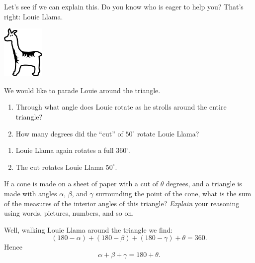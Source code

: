 \documentclass[nooutcomes,noauthor,handout]{../ximera}
\begin{document}
\begin{question}
  Let's see if we can explain this. Do you know who is eager to help
you? That's right: Louie Llama.
\begin{center}
\includegraphics[height=1in]{llama.pdf}
\end{center}

We would like to parade Louie around the triangle.
\begin{enumerate}
\item Through what angle does Louie rotate as he strolls around the
  entire triangle?
\item How many degrees did the ``cut'' of $50^\circ$ rotate Louie
  Llama?
\end{enumerate}
\begin{freeResponse}
  \begin{enumerate}
  \item Louie Llama again rotates a full $360^\circ$.
  \item The cut rotates Louie Llama $50^\circ$.
  \end{enumerate}
\end{freeResponse}
\end{question}

\mynewpage


\begin{question}
If a cone is made on a sheet of paper with a cut of $\theta$ degrees,
and a triangle is made with angles $\alpha$, $\beta$, and $\gamma$
surrounding the point of the cone, what is the sum of the measures of
the interior angles of this triangle? \emph{Explain} your reasoning using words, pictures, numbers, and so on.
\begin{freeResponse}
  Well, walking Louie Llama around the triangle we find:
  \[
  (180-\alpha) + (180-\beta) + (180-\gamma) + \theta = 360.
  \]
  Hence
  \[
  \alpha + \beta + \gamma = 180 + \theta.
  \]
\end{freeResponse}
\end{question}
\end{document}
